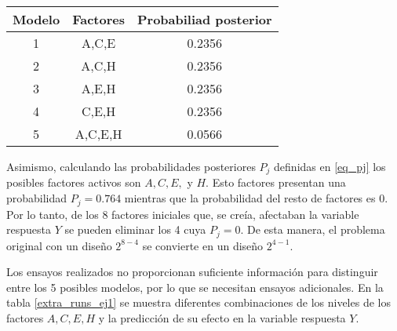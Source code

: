 \begin{center}
	\begin{tabular}{ccc}
		Modelo & Factores & Probabiliad posterior \\
		\hline
		1 & A,C,E & 0.2356 \\
		
		2 & A,C,H & 0.2356 \\
		
		3 & A,E,H & 0.2356 \\
		
		4 & C,E,H & 0.2356 \\
		
		5 & A,C,E,H & 0.0566 \\
		
	\end{tabular}
	 \label{modelos_prob_post}
\end{center}

Asimismo, calculando las probabilidades posteriores $P_j$ definidas en \ref{eq_pj} los posibles factores activos son $A, C, E,$ y $H$. Esto factores presentan una probabilidad $P_j = 0.764$ mientras que la probabilidad del resto de factores es $0$. Por lo tanto, de los 8 factores iniciales que, se creía, afectaban la variable respuesta $Y$ se pueden eliminar los 4 cuya $P_j = 0$. De esta manera, el problema original con un diseño $2^{8-4}$ se convierte en un diseño $2^{4-1}$. 

Los ensayos realizados no proporcionan suficiente información para distinguir entre los 5 posibles modelos, por lo que se necesitan ensayos adicionales. En la tabla \ref{extra_runs_ej1} se muestra diferentes combinaciones de los niveles de los factores $A, C, E, H$ y la predicción de su efecto en la variable respuesta $Y$. 

